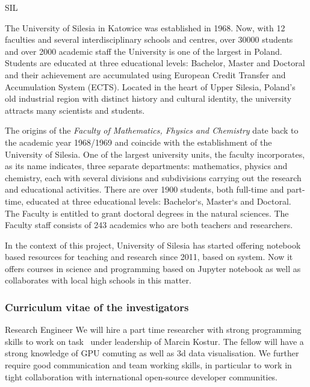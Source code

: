 \begin{sitedescription}{SIL}\label{desc:SIL}

The University of Silesia in Katowice was established in 1968. Now,
with 12 faculties and several interdisciplinary schools and centres,
over 30000 students and over 2000 academic staff the University is one
of the largest in Poland. Students are educated at three educational
levels: Bachelor, Master and Doctoral and their achievement are
accumulated using European Credit Transfer and Accumulation System
(ECTS). Located in the heart of Upper Silesia, Poland's old industrial
region with distinct history and cultural identity, the university
attracts many scientists and students.

The origins of the {\em Faculty of Mathematics, Fhysics and Chemistry} date
back to the academic year 1968/1969 and coincide with the
establishment of the University of Silesia. One of the largest
university units, the faculty incorporates, as its name indicates,
three separate departments: mathematics, physics and chemistry, each
with several divisions and subdivisions carrying out the research and
educational activities. There are over 1900 students, both full-time
and part-time, educated at three educational levels: Bachelor`s,
Master`s and Doctoral. The Faculty is entitled to grant doctoral
degrees in the natural sciences. The Faculty staff consists of 243
academics who are both teachers and researchers.


In the context of this project, University of Silesia has started offering notebook based resources for teaching and research since 2011, based on \Sage system. Now it offers courses in science and programming based on Jupyter notebook as well as collaborates with local high schools in this matter. 


\subsubsection*{Curriculum vitae of the investigators}




\begin{participant}[type=R,PM=16,salary=2500]{Research Engineer}
    We will hire a part time researcher with strong programming skills to work on task~ under leadership of Marcin Kostur. 
The fellow will have a strong knowledge of GPU comuting as well as 3d data visualisation. 
We further require good communication and team working skills, in particular to work in tight collaboration with international open-source developer communities.
\end{participant}


\end{sitedescription}
